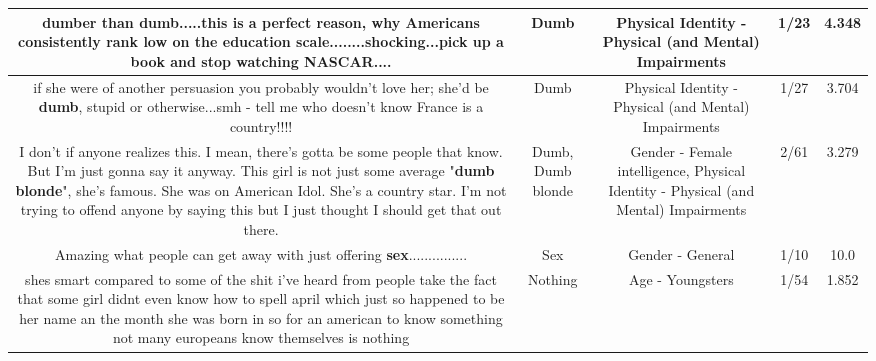 \documentclass[11pt]{article}
\newlength\mylength
\begin{document}
\begin{center}
\begin{longtable}{|C{.65\mylength}|C{.30\mylength}|C{.12\mylength}|C{.12\mylength}|C{.12\mylength}|}
  \small dumber than \textbf{dumb}.....this is a perfect reason, why Americans consistently rank low on the education scale........shocking...pick up a book and stop watching NASCAR....\normalsize   & Dumb & Physical Identity - Physical (and Mental) Impairments & 1/23 & 4.348 \\  \hline
  \small if she were of another persuasion you probably wouldn't love her; she'd be \textbf{dumb}, stupid or otherwise...smh - tell me who doesn't know France is a country!!!!\normalsize   & Dumb & Physical Identity - Physical (and Mental) Impairments & 1/27 & 3.704 \\  \hline
  \small I don't if anyone realizes this. I mean, there's gotta be some people that know.  But I'm just gonna say it anyway. This girl is not just some average "\textbf{d\textbf{umb} blonde}", she's famous. She was on American Idol. She's a country star.  I'm not trying to offend anyone by saying this but I just thought I should get that out there.\normalsize   & Dumb, Dumb blonde & Gender - Female intelligence, Physical Identity - Physical (and Mental) Impairments & 2/61 & 3.279 \\  \hline
  \small Amazing what people can get away with just offering \textbf{sex}...............\normalsize   & Sex & Gender - General & 1/10 & 10.0 \\  \hline
  \small shes smart compared to some of the shit i've heard from people take the fact that some girl didnt even know how to spell april which just so happened to be her name an the month she was born in so for an american to know something not many europeans know themselves is nothing\normalsize   & Nothing & Age - Youngsters & 1/54 & 1.852 \\  \hline
  
\end{longtable}
\end{center}
\end{document}
